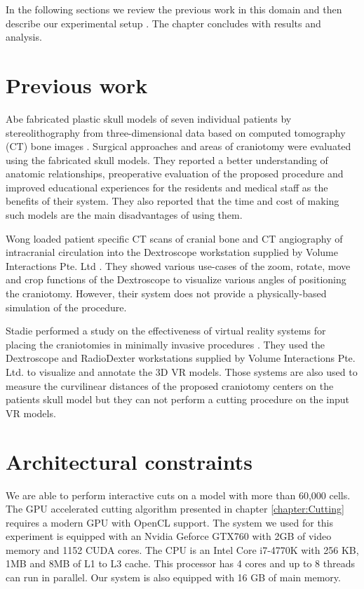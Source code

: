 In the following sections we review the previous work in this domain and then describe our experimental 
setup . The chapter concludes with results and analysis.

\section{Previous work}
Abe \etal fabricated plastic skull models of seven individual patients by stereolithography from three-dimensional
data based on computed tomography (CT) bone images \cite{Abe1998}. Surgical approaches and areas of craniotomy were 
evaluated using the fabricated skull models. They reported a better understanding of anatomic relationships, preoperative
evaluation of the proposed procedure and improved educational experiences for the residents and medical staff as the benefits of 
their system. They also reported that the time and cost of making such models are the main disadvantages of using them.

Wong \etal loaded patient specific CT scans of cranial bone and CT angiography of intracranial circulation
into the Dextroscope workstation supplied by Volume Interactions Pte. Ltd \cite{Wong2007}. They showed various 
use-cases of the zoom, rotate, move and crop functions of the Dextroscope to visualize various angles of 
positioning the craniotomy. However, their system does not provide a physically-based simulation of the procedure. 

Stadie \etal performed a study on the effectiveness of virtual reality systems for placing the craniotomies 
in minimally invasive procedures \cite{Stadie2011}.  They used the Dextroscope and RadioDexter workstations 
supplied by Volume Interactions Pte. Ltd. to visualize and annotate the 3D VR models. 
Those systems are also used to measure the curvilinear distances of the proposed craniotomy centers on the 
patients skull model but they can not perform a cutting procedure on the input VR models.

\section{Architectural constraints}
We are able to perform interactive cuts on a model with more than 60,000 cells. The GPU accelerated cutting algorithm 
presented in chapter \ref{chapter:Cutting} requires a modern GPU with OpenCL support. The system we used for this
experiment is equipped with an Nvidia Geforce GTX760 with 2GB of video memory and 1152 CUDA cores. The CPU is an 
Intel Core i7-4770K with 256 KB, 1MB and 8MB of L1 to L3 cache. This processor has 4 cores and up to 8 threads can run in parallel. 
Our system is also equipped with 16 GB of main memory. 

